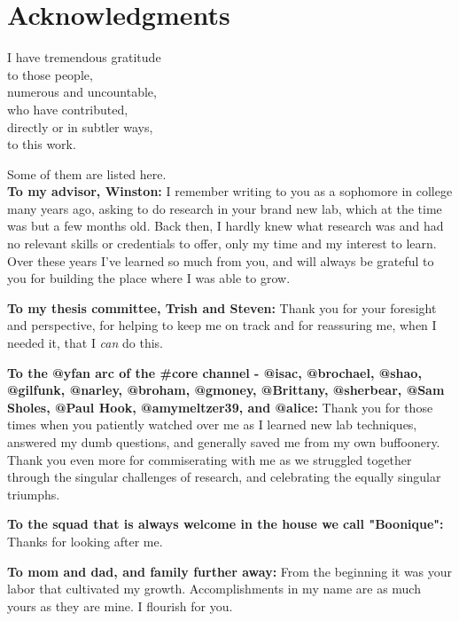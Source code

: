 \chapter*{Acknowledgments}

I have tremendous gratitude \\
to those people, \\
numerous and uncountable, \\
who have contributed, \\
directly or in subtler ways, \\
to this work.

Some of them are listed here. \\

\textbf{To my advisor, Winston:} I remember writing to you as a sophomore in college many years ago, asking to do research in your brand new lab, which at the time was but a few months old. Back then, I hardly knew what research was and had no relevant skills or credentials to offer, only my time and my interest to learn. Over these years I've learned so much from you, and will always be grateful to you for building the place where I was able to grow.

\textbf{To my thesis committee, Trish and Steven:} Thank you for your foresight and perspective, for helping to keep me on track and for reassuring me, when I needed it, that I \emph{can} do this.

\textbf{To the @yfan arc of the #core channel - @isac, @brochael, @shao, @gilfunk, @narley, @broham, @gmoney, @Brittany, @sherbear, @Sam Sholes, @Paul Hook, @amymeltzer39, and @alice:} Thank you for those times when you patiently watched over me as I learned new lab techniques, answered my dumb questions, and generally saved me from my own buffoonery. Thank you even more for commiserating with me as we struggled together through the singular challenges of research, and celebrating the equally singular triumphs.

\textbf{To the squad that is always welcome in the house we call "Boonique":} Thanks for looking after me.

\textbf{To mom and dad, and family further away:} From the beginning it was your labor that cultivated my growth. Accomplishments in my name are as much yours as they are mine. I flourish for you.
